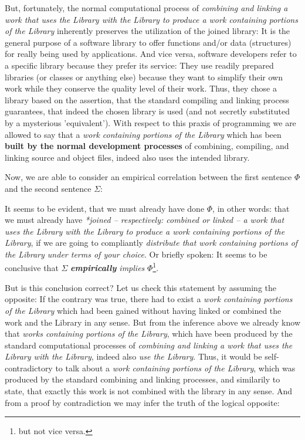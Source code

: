 But, fortunately, the normal computational process of \emph{combining and
linking a work that uses the Library with the Library to produce a work
containing portions of the Library} inherently preserves the utilization of the
joined library: It is the general purpose of a software library to offer
functions and/or data (structures) for really being used by applications. And
vice versa, software developers refer to a specific library because they prefer
its service: They use readily prepared libraries (or classes or anything else)
because they want to simplify their own work while they conserve the quality
level of their work. Thus, they chose a library based on the assertion, that the
standard compiling and linking process guarantees, that indeed the chosen
library is used (and not secretly substituted by a mysterious 'equivalent').
With respect to this praxis of programming we are allowed to say that a
\emph{work containing portions of the Library} which has been \textbf{built by
the normal development processes} of combining, compiling, and linking source
and object files, indeed also uses the intended library.

Now, we are able to consider an empirical correlation between the first sentence
$\Phi$ and the second sentence $\Sigma$:

It seems to be evident, that we must already have done $\Phi$, in other words:
that we must already have \emph{*joined -- respectively: combined or linked -- a
work that uses the Library with the Library to produce a work containing
portions of the Library}, if we are going to compliantly \emph{distribute that
work containing portions of the Library under terms of your choice}. Or briefly
spoken: It seems to be conclusive that $\Sigma$ \emph{\textbf{empirically}
implies} $\Phi$\footnote{but not vice versa.}.

But is this conclusion correct? Let us check this statement by assuming the
opposite: If the contrary was true, there had to exist a \emph{work containing
portions of the Library} which had been gained without having linked or combined
the work and the Library in any sense. But from the inference above we already
know that \emph{works containing portions of the Library}, which have been
produced by the standard computational processes of \emph{combining and linking
a work that uses the Library with the Library}, indeed also \emph{use the
Library}. Thus, it would be self-contradictory to talk about a \emph{work
containing portions of the Library}, which was produced by the standard
combining and linking processes, and similarily to state, that exactly this work
is not combined with the library in any sense. And from a proof by contradiction
we may infer the truth of the logical opposite:

